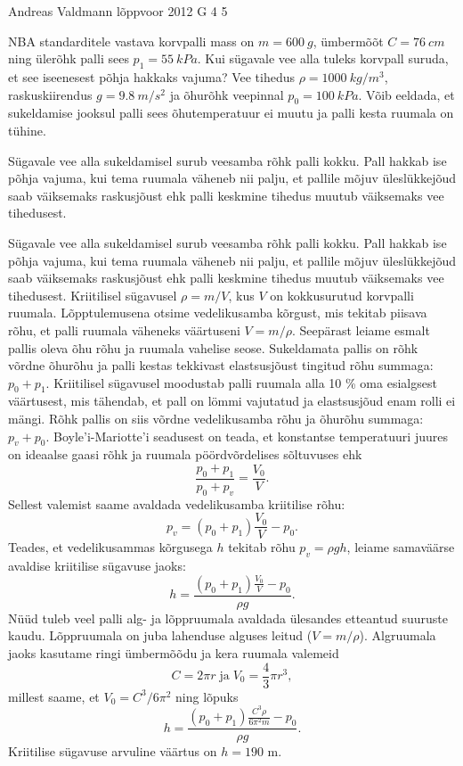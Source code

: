 {Andreas Valdmann} %
{lõppvoor} %
{2012} %
{G 4} %
{5} %
{
\ifStatement
NBA standarditele vastava korvpalli mass on $m=\SI{600}{g}$, ümbermõõt
$C=\SI{76}{cm}$ ning ülerõhk palli sees $p_1=\SI{55}{kPa}$. Kui sügavale vee
alla tuleks korvpall suruda, et see iseenesest põhja hakkaks vajuma? Vee tihedus
$\rho=\SI{1000}{kg/m^3}$, raskuskiirendus $g=\SI{9,8}{m/s^2}$ ja õhurõhk
veepinnal $p_0=\SI{100}{kPa}$. Võib eeldada, et sukeldamise jooksul palli sees
õhutemperatuur ei muutu ja palli kesta ruumala on tühine.
\fi


\ifHint
Sügavale vee alla sukeldamisel surub veesamba rõhk palli kokku. Pall hakkab ise põhja vajuma, kui tema ruumala väheneb nii palju, et pallile mõjuv üleslükkejõud saab väiksemaks raskusjõust ehk palli keskmine tihedus muutub väiksemaks vee tihedusest.
\fi


\ifSolution
Sügavale vee alla sukeldamisel surub veesamba rõhk palli kokku. Pall hakkab ise põhja vajuma, kui tema ruumala väheneb nii palju, et pallile mõjuv üleslükkejõud saab väiksemaks raskusjõust ehk palli keskmine tihedus muutub väiksemaks vee tihedusest. Kriitilisel sügavusel $\rho=m/V$, kus $V$ on kokkusurutud korvpalli ruumala. Lõpptulemusena otsime vedelikusamba kõrgust, mis tekitab piisava rõhu, et palli ruumala väheneks väärtuseni $V=m/\rho$. Seepärast leiame esmalt pallis oleva õhu rõhu ja ruumala vahelise seose. Sukeldamata pallis on rõhk võrdne õhurõhu ja palli kestas tekkivast elastsusjõust tingitud rõhu summaga: $p_0+p_1$. Kriitilisel sügavusel moodustab palli ruumala alla 10 \% oma esialgsest väärtusest, mis tähendab, et pall on lömmi vajutatud ja elastsusjõud enam rolli ei mängi. Rõhk pallis on siis võrdne vedelikusamba rõhu ja õhurõhu summaga: $p_v+p_0$. Boyle'i-Mariotte'i seadusest on teada, et konstantse temperatuuri juures on ideaalse gaasi rõhk ja ruumala pöördvõrdelises sõltuvuses ehk
\[
\frac{p_0+p_1}{p_0+p_v}=\frac{V_0}{V}.
\]
Sellest valemist saame avaldada vedelikusamba kriitilise rõhu:
\[
p_v = (p_0+p_1) \frac{V_0}{V} - p_0.
\]
Teades, et vedelikusammas kõrgusega $h$ tekitab rõhu $p_v=\rho g h$, leiame samaväärse avaldise kriitilise sügavuse jaoks:
\[
h = \frac{(p_0+p_1) \frac{V_0}{V} - p_0}{\rho g}.
\]
Nüüd tuleb veel palli alg- ja lõppruumala avaldada ülesandes etteantud suuruste kaudu. Lõppruumala on juba lahenduse alguses leitud ($V=m/\rho$). Algruumala jaoks kasutame ringi ümbermõõdu ja kera ruumala valemeid
\[
C = 2\pi r \; \text{ja} \; V_0 = \frac{4}{3}\pi r^3,
\]
millest saame, et $V_0=C^3/6\pi^2$ ning lõpuks
\[
h = \frac{(p_0+p_1) \frac{C^3 \rho}{6\pi^2 m} - p_0}{\rho g}.
\]
Kriitilise sügavuse arvuline väärtus on $h=190$ m.
\fi


}
